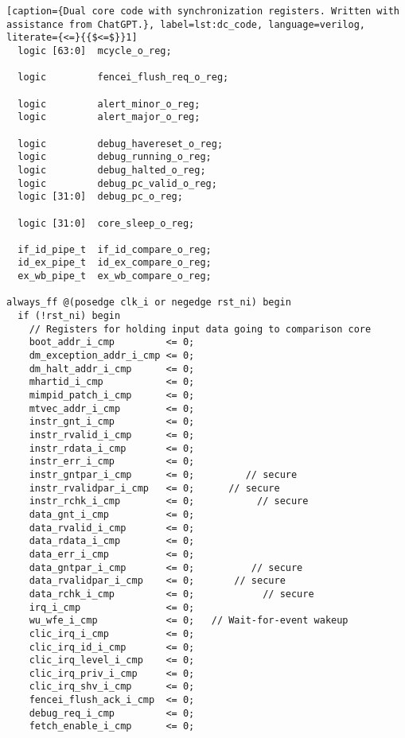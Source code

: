 \begin{lstlisting}[caption={Dual core code with synchronization registers. Written with assistance from ChatGPT.}, label=lst:dc_code, language=verilog, literate={<=}{{$<=$}}1]
  logic [63:0]  mcycle_o_reg;  

  logic         fencei_flush_req_o_reg;  

  logic         alert_minor_o_reg;       
  logic         alert_major_o_reg;

  logic         debug_havereset_o_reg;   
  logic         debug_running_o_reg;     
  logic         debug_halted_o_reg;      
  logic         debug_pc_valid_o_reg;    
  logic [31:0]  debug_pc_o_reg;       

  logic [31:0]  core_sleep_o_reg;   

  if_id_pipe_t  if_id_compare_o_reg;     
  id_ex_pipe_t  id_ex_compare_o_reg;    
  ex_wb_pipe_t  ex_wb_compare_o_reg;     

always_ff @(posedge clk_i or negedge rst_ni) begin
  if (!rst_ni) begin 
    // Registers for holding input data going to comparison core
    boot_addr_i_cmp         <= 0;
    dm_exception_addr_i_cmp <= 0;
    dm_halt_addr_i_cmp      <= 0;
    mhartid_i_cmp           <= 0;
    mimpid_patch_i_cmp      <= 0;
    mtvec_addr_i_cmp        <= 0;
    instr_gnt_i_cmp         <= 0;
    instr_rvalid_i_cmp      <= 0;
    instr_rdata_i_cmp       <= 0;
    instr_err_i_cmp         <= 0;
    instr_gntpar_i_cmp      <= 0;         // secure
    instr_rvalidpar_i_cmp   <= 0;      // secure
    instr_rchk_i_cmp        <= 0;           // secure
    data_gnt_i_cmp          <= 0;
    data_rvalid_i_cmp       <= 0;
    data_rdata_i_cmp        <= 0;
    data_err_i_cmp          <= 0;
    data_gntpar_i_cmp       <= 0;          // secure
    data_rvalidpar_i_cmp    <= 0;       // secure
    data_rchk_i_cmp         <= 0;            // secure
    irq_i_cmp               <= 0;
    wu_wfe_i_cmp            <= 0;   // Wait-for-event wakeup
    clic_irq_i_cmp          <= 0;
    clic_irq_id_i_cmp       <= 0;
    clic_irq_level_i_cmp    <= 0; 
    clic_irq_priv_i_cmp     <= 0;
    clic_irq_shv_i_cmp      <= 0;
    fencei_flush_ack_i_cmp  <= 0;
    debug_req_i_cmp         <= 0;
    fetch_enable_i_cmp      <= 0;


\end{lstlisting}
